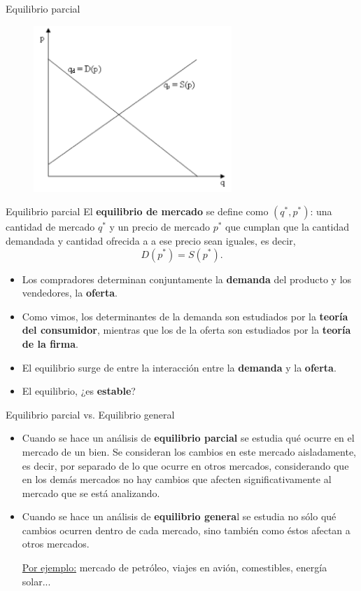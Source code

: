 \documentclass{beamer}
\begin{document}
\begin{frame}{Equilibrio parcial}
\begin{figure}
\includegraphics[width=7.5cm]{figures1/equilibrium.png}
\end{figure}
\end{frame}

\begin{frame}{Equilibrio parcial}
    El \textbf{equilibrio de mercado} se define como $(q^{*},p^{*})$: una cantidad de mercado $q^{*}$ y un precio de mercado $p^{*}$ que cumplan que la cantidad demandada y cantidad ofrecida a a ese precio sean iguales, es decir, 
    \[D(p^{*}) = S(p^{*}).\]
    
    \begin{itemize}
        \item Los compradores determinan conjuntamente la \textbf{demanda} del producto y los vendedores, la \textbf{oferta}.
        \item Como vimos, los determinantes de la demanda son estudiados por la \textbf{teoría del consumidor}, mientras que los de la oferta son estudiados por la \textbf{teoría de la firma}.
        \item El equilibrio surge de entre la interacción entre la \textbf{demanda} y la \textbf{oferta}.
        \item El equilibrio, ¿es \textbf{estable}?
    \end{itemize}
\end{frame}

\begin{frame}{Equilibrio parcial vs. Equilibrio general}
    \begin{itemize}
\item    Cuando se hace un análisis de  \textbf{equilibrio parcial} se estudia qué ocurre en el mercado de un bien. Se consideran los cambios en este mercado aisladamente, es decir, por separado de lo que ocurre en otros mercados, considerando que en los demás mercados no hay cambios que afecten significativamente al mercado que se está analizando.
    
 \item   Cuando se hace un análisis de \textbf{equilibrio genera}l se estudia no sólo qué cambios ocurren dentro de cada mercado, sino también como éstos afectan a otros mercados.
 
 \vspace{6pt}
 \underline{Por ejemplo:} mercado de petróleo, viajes en avión, comestibles, energía solar...
    
 \end{itemize}   
\end{frame}
\end{document}
